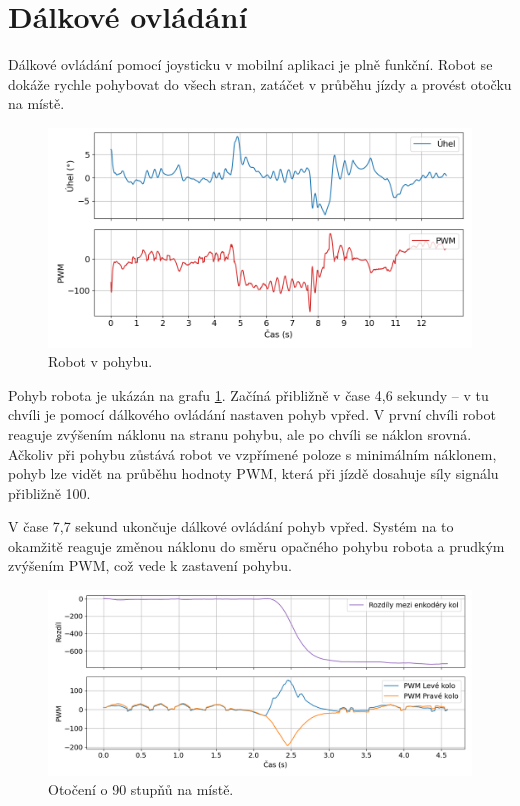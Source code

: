 \section{Dálkové ovládání}
Dálkové ovládání pomocí joysticku v mobilní aplikaci je plně funkční. Robot se dokáže rychle pohybovat do všech stran, zatáčet v průběhu jízdy a provést otočku na místě.

\begin{figure}[H]
  \centering
  \includegraphics[width=1.0\linewidth]{obrazky-figures/move.png}%
  \caption{Robot v pohybu.}
  \label{move}
\end{figure}

Pohyb robota je ukázán na grafu \ref{move}. Začíná přibližně v čase 4,6 sekundy -- v tu chvíli je pomocí dálkového ovládání nastaven pohyb vpřed. V první chvíli robot reaguje zvýšením náklonu na stranu pohybu, ale po chvíli se náklon srovná. Ačkoliv při pohybu zůstává robot ve vzpřímené poloze s minimálním náklonem, pohyb lze vidět na průběhu hodnoty PWM, která při jízdě dosahuje síly signálu přibližně 100.

V čase 7,7 sekund ukončuje dálkové ovládání pohyb vpřed. Systém na to okamžitě reaguje změnou náklonu do směru opačného pohybu robota a prudkým zvýšením PWM, což vede k zastavení pohybu.
\begin{figure}[H]
  \centering
  \includegraphics[width=1.0\linewidth]{obrazky-figures/turn.png}%
  \caption{Otočení o 90 stupňů na místě.}
  \label{turn_g}
\end{figure}

